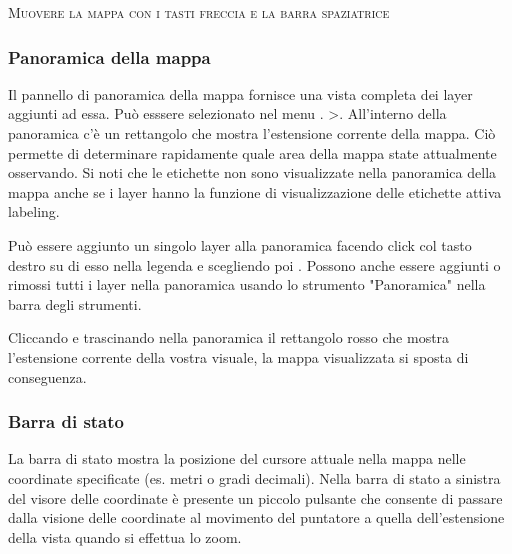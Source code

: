 \begin{Tip}\caption{\textsc{Muovere la mappa con i tasti freccia e la barra spaziatrice}}
\end{Tip}

\subsubsection{Panoramica della mappa}\label{label_mapoverview}

Il pannello di panoramica della mappa fornisce una vista completa dei layer aggiunti ad essa. Può 
esssere selezionato nel menu . >.
All’interno della panoramica c’è un rettangolo che mostra l’estensione corrente della mappa. Ciò permette 
di determinare rapidamente quale area della mappa state attualmente osservando. Si noti 
che le etichette non sono visualizzate nella panoramica della mappa anche se i layer 
hanno la funzione di visualizzazione delle etichette attiva labeling. 

Può essere aggiunto un singolo layer alla panoramica facendo click col tasto destro su di 
esso nella legenda e scegliendo poi . Possono anche essere aggiunti o rimossi tutti i layer nella
panoramica usando lo strumento "Panoramica" nella barra degli strumenti. 

Cliccando e trascinando nella panoramica il rettangolo rosso che mostra
l'estensione corrente della vostra visuale, la mappa visualizzata si sposta di conseguenza.

\subsubsection{Barra di stato}\label{label_statusbar}

La barra di stato mostra la posizione del cursore attuale nella mappa nelle
coordinate specificate (es. metri o gradi decimali).
Nella barra di stato a sinistra del visore delle coordinate è presente un
piccolo pulsante che consente di passare dalla visione delle coordinate al
movimento del puntatore a
quella dell'estensione della vista quando si effettua lo zoom.

